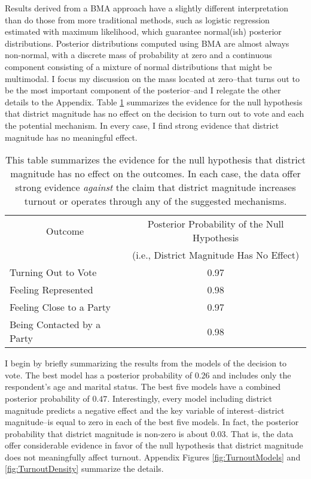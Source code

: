 \documentclass[12pt]{article}
\begin{document}
Results derived from a BMA approach have a slightly different interpretation than do those from more traditional methods, such as logistic regression estimated with maximum likelihood, which guarantee normal(ish) posterior distributions. Posterior distributions computed using BMA are almost always non-normal, with a discrete mass of probability at zero and a continuous component consisting of a mixture of normal distributions that might be multimodal. I focus my discussion on the mass located at zero--that turns out to be the most important component of the posterior--and I relegate the other details to the Appendix. Table \ref{tab:results} summarizes the evidence for the null hypothesis that district magnitude has no effect on the decision to turn out to vote and each the potential mechanism. In every case, I find strong evidence that district magnitude has no meaningful effect.

\begin{table}[h!]
\begin{center}
\begin{tabular}{lc}
\multicolumn{1}{c}{Outcome}  & Posterior Probability of the Null Hypothesis\\
& (i.e., District Magnitude Has No Effect)\\
\hline
Turning Out to Vote & 0.97 \\
Feeling Represented & 0.98 \\
Feeling Close to a Party & 0.97 \\
Being Contacted by a Party & 0.98
\end{tabular}\caption{This table summarizes the evidence for the null hypothesis that district magnitude has no effect on the outcomes. In each case, the data offer strong evidence \emph{against} the claim that district magnitude increases turnout or operates through any of the suggested mechanisms.}\label{tab:results}
\end{center}
\end{table}%

I begin by briefly summarizing the results from the models of the decision to vote. The best model has a posterior probability of $0.26$ and includes only the respondent's age and marital status. The best five models have a combined posterior probability of $0.47$. Interestingly, every model including district magnitude predicts a negative effect and the key variable of interest--district magnitude--is equal to zero in each of the best five models. In fact, the posterior probability that district magnitude is non-zero is about $0.03$. That is, the data offer considerable evidence in favor of the null hypothesis that district magnitude does not meaningfully affect turnout.  Appendix Figures \ref{fig:TurnoutModels} and \ref{fig:TurnoutDensity} summarize the details. 
\end{document}
